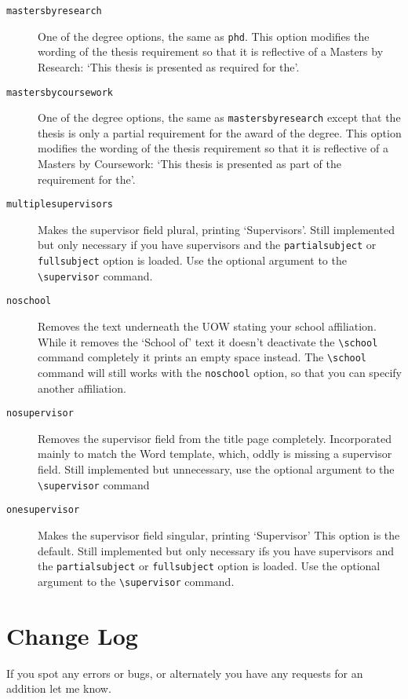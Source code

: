 \documentclass[12pt,oneside]{article}
\newcommand{\oporcom}[1]{\texttt{\color{Red}#1}} %
\begin{document}
\begin{description}
    \item[\oporcom{mastersbyresearch}]
    One of the degree options, the same as \oporcom{phd}. This option modifies the wording of the thesis requirement so that it is reflective of a Masters by Research: `This thesis is presented as required for the'.
    
    \item[\oporcom{mastersbycoursework}]
    One of the degree options, the same as \oporcom{mastersbyresearch} except that the thesis is only a partial requirement for the award of the degree. This option modifies the wording of the thesis requirement so that it is reflective of a Masters by Coursework: `This thesis is presented as part of the requirement for the'.
    
    \item[\oporcom{multiplesupervisors}]
    Makes the supervisor field plural, printing `Supervisors'. Still implemented but only necessary if you have supervisors and the \oporcom{partialsubject} or \oporcom{fullsubject} option is loaded. Use the optional argument to the \oporcom{\textbackslash{}supervisor} command.
    
    \item[\oporcom{noschool}]
    Removes the text underneath the UOW stating your school affiliation. While it removes the `School of' text it doesn't deactivate the \oporcom{\textbackslash{}school} command completely it prints an empty space instead. The \oporcom{\textbackslash{}school} command will still works with the \oporcom{noschool} option, so that you can specify another affiliation.
    
    \item[\oporcom{nosupervisor}]
    Removes the supervisor field from the title page completely. Incorporated mainly to match the Word template, which, oddly is missing a supervisor field. Still implemented but unnecessary, use the optional argument to the \oporcom{\textbackslash{}supervisor} command
    
    \item[\oporcom{onesupervisor}]
    Makes the supervisor field singular, printing `Supervisor' This option is the default. Still implemented but only necessary ifs you have supervisors and the \oporcom{partialsubject} or \oporcom{fullsubject} option is loaded. Use the optional argument to the \oporcom{\textbackslash{}supervisor} command.
    
\end{description}

\section{Change Log}
If you spot any errors or bugs, or alternately you have any requests for an addition let me know.
\end{document}
